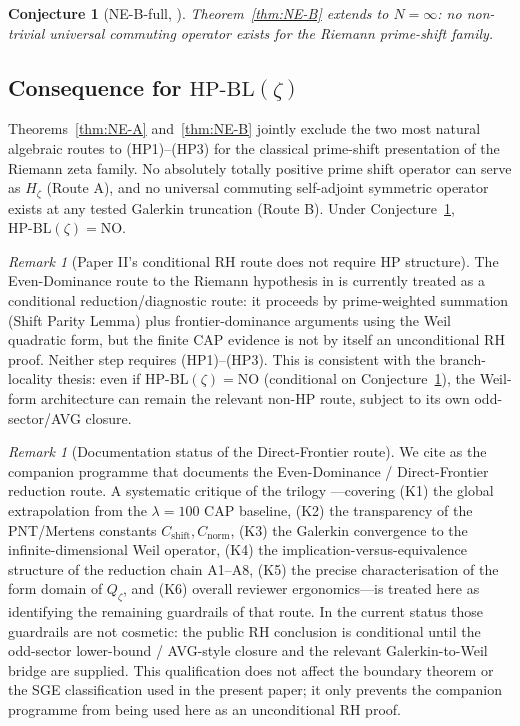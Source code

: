 \documentclass[11pt]{article}
\newtheorem{conjecture}[theorem]{Conjecture}
\theoremstyle{definition}
\theoremstyle{remark}
\newtheorem{remark}[theorem]{Remark}
\newcommand{\HBL}{\mathrm{HP\text{-}BL}}
\begin{document}
\begin{conjecture}[NE-B-full, {\cite[Conj.~\ref{thm:NE-B}-full]{Geiger2026RHII}}]\label{conj:NE-B-full}
Theorem~\ref{thm:NE-B} extends to $N = \infty$: no non-trivial
universal commuting operator exists for the Riemann prime-shift family.
\end{conjecture}

\subsection{Consequence for \texorpdfstring{$\HBL(\zeta)$}{HP-BL(zeta)}}

Theorems~\ref{thm:NE-A} and~\ref{thm:NE-B} jointly exclude the two
most natural algebraic routes to (HP1)--(HP3) for the classical
prime-shift presentation of the Riemann zeta family. No
absolutely totally positive prime shift operator can serve as $H_\zeta$
(Route A), and no universal commuting self-adjoint symmetric operator
exists at any tested Galerkin truncation (Route B). Under
Conjecture~\ref{conj:NE-B-full}, $\HBL(\zeta) = \mathrm{NO}$.

\begin{remark}[Paper II's conditional RH route does not require HP structure]
\label{rem:riemann-without-hp}
The Even-Dominance route to the Riemann hypothesis in
\cite{Geiger2026RHII} is currently treated as a conditional
reduction/diagnostic route: it proceeds by prime-weighted summation
(Shift Parity Lemma) plus frontier-dominance arguments using the Weil
quadratic form, but the finite CAP evidence is not by itself an
unconditional RH proof. Neither step requires (HP1)--(HP3). This is
consistent with the branch-locality thesis: even if
$\HBL(\zeta) = \mathrm{NO}$ (conditional on
Conjecture~\ref{conj:NE-B-full}), the Weil-form architecture can remain
the relevant non-HP route, subject to its own odd-sector/AVG closure.
\end{remark}

\begin{remark}[Documentation status of the Direct-Frontier route]
\label{rem:riemann-critique-review}
We cite \cite{Geiger2026RHII} as the companion programme that documents
the Even-Dominance / Direct-Frontier reduction route. A systematic
critique of the trilogy
\cite{Geiger2026RHII,Geiger2026RHIII}---covering (K1) the global
extrapolation from the $\lambda = 100$ CAP baseline, (K2) the
transparency of the PNT/Mertens constants
$C_{\mathrm{shift}}, C_{\mathrm{norm}}$, (K3) the Galerkin convergence
to the infinite-dimensional Weil operator, (K4) the
implication-versus-equivalence structure of the reduction chain A1--A8,
(K5) the precise characterisation of the form domain of $Q_\zeta$, and
(K6) overall reviewer ergonomics---is treated here as identifying the
remaining guardrails of that route. In the current status those
guardrails are not cosmetic: the public RH conclusion is conditional
until the odd-sector lower-bound / AVG-style closure and the relevant
Galerkin-to-Weil bridge are supplied. This qualification does not affect
the boundary theorem or the SGE classification used in the present
paper; it only prevents the companion programme from being used here as
an unconditional RH proof.
\end{remark}
\end{document}
